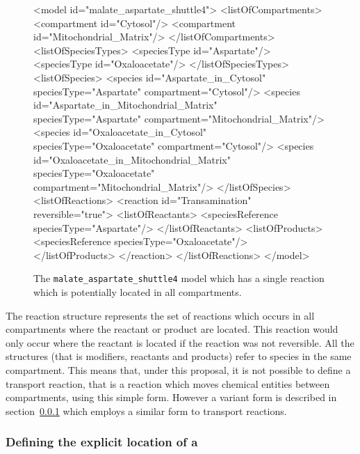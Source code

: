 \documentclass{cekarticle}
\begin{document}
\begin{figure}[h]
\begin{example}
<model id="malate_aspartate_shuttle4">
    <listOfCompartments>
        <compartment id="Cytosol"/>
        <compartment id="Mitochondrial_Matrix"/>
    </listOfCompartments>
    <listOfSpeciesTypes>
        <speciesType id="Aspartate"/>
        <speciesType id="Oxaloacetate"/>
    </listOfSpeciesTypes>
    <listOfSpecies>
        <species
            id="Aspartate_in_Cytosol"
            speciesType="Aspartate"
            compartment="Cytosol"/>
        <species
            id="Aspartate_in_Mitochondrial_Matrix"
            speciesType="Aspartate"
            compartment="Mitochondrial_Matrix"/>
        <species
            id="Oxaloacetate_in_Cytosol"
            speciesType="Oxaloacetate"
            compartment="Cytosol"/>
        <species
            id="Oxaloacetate_in_Mitochondrial_Matrix"
            speciesType="Oxaloacetate"
            compartment="Mitochondrial_Matrix"/>
    </listOfSpecies>
    <listOfReactions>
        <reaction id="Transamination" reversible="true">
            <listOfReactants>
                <speciesReference speciesType="Aspartate"/>
            </listOfReactants>
            <listOfProducts>
                <speciesReference speciesType="Oxaloacetate"/>
            </listOfProducts>
        </reaction>
    </listOfReactions>
</model>
\end{example}
\caption{The \texttt{malate\_aspartate\_shuttle4} model which has a single reaction which is potentially
located in all compartments.} 
\label{fig:malate_aspartate_shuttle4-xml}
\end{figure}

The reaction structure represents the set of reactions which occurs in all compartments where 
the reactant or product are located.  This reaction would only occur where the reactant is located
if the reaction was not reversible.  All the  structures (that is
modifiers, reactants and products) refer to 
species in the same compartment.  This means that, under this proposal, it is not possible to define
a transport reaction, that is a reaction which moves chemical entities between compartments,
using this simple form.  However a variant form is described in
section~\ref{sec:locatedspeciesreferences} which employs a similar form to transport reactions.

\subsubsection{Defining the explicit location of a }
\label{sec:locatedspeciesreferences}
\end{document}
